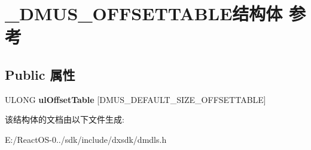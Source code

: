 \hypertarget{struct___d_m_u_s___o_f_f_s_e_t_t_a_b_l_e}{}\section{\+\_\+\+D\+M\+U\+S\+\_\+\+O\+F\+F\+S\+E\+T\+T\+A\+B\+L\+E结构体 参考}
\label{struct___d_m_u_s___o_f_f_s_e_t_t_a_b_l_e}
\subsection*{Public 属性}
\begin{DoxyCompactItemize}
\item 
\mbox{\label{struct___d_m_u_s___o_f_f_s_e_t_t_a_b_l_e_a400e4cae0dfc5f366a80201ed8e5f8ef}} 
U\+L\+O\+NG {\bfseries ul\+Offset\+Table} \mbox{[}D\+M\+U\+S\+\_\+\+D\+E\+F\+A\+U\+L\+T\+\_\+\+S\+I\+Z\+E\+\_\+\+O\+F\+F\+S\+E\+T\+T\+A\+B\+LE\mbox{]}
\end{DoxyCompactItemize}


该结构体的文档由以下文件生成\+:\begin{DoxyCompactItemize}
\item 
E\+:/\+React\+O\+S-\/0../sdk/include/dxsdk/dmdls.\+h\end{DoxyCompactItemize}
